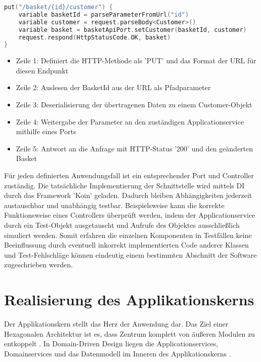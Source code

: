 \begin{minipage}{\linewidth} %
\begin{lstlisting}[caption={Beispiel eines Controllers zum aktualiseren von Kundendaten}, label={lst:controller}, language=Kotlin]
put("/basket/{id}/customer") { 
	variable basketId = parseParameterFromUrl("id")
	variable customer = request.parseBody<Customer>()  
	variable basket = basketApiPort.setCustomer(basketId, customer)
	request.respond(HttpStatusCode.OK, basket)
}
\end{lstlisting}

\begin{itemize}[noitemsep,nolistsep]
	\item Zeile 1: Definiert die HTTP-Methode als 'PUT' und das Format der URL für diesen Endpunkt
	\item Zeile 2: Auslesen der BasketId aus der URL als Pfadparameter
	\item Zeile 3: Deserialisierung der übertragenen Daten zu einem Customer-Objekt
	\item Zeile 4: Weitergabe der Parameter an den zuständigen Applicationservice mithilfe eines Ports
	\item Zeile 5: Antwort an die Anfrage mit HTTP-Status '200' und den geänderten Basket
\end{itemize}
\end{minipage}

Für jeden definierten Anwendungsfall ist ein entsprechender Port und Controller zuständig. Die tatsächliche Implementierung der Schnittstelle wird mittels \Gls{DI} durch das Framework 'Koin' geladen. Dadurch bleiben Abhängigkeiten jederzeit austauschbar und unabhängig testbar. Beispielsweise kann die korrekte Funktionsweise eines Controllers überprüft werden, indem der Applicationservice durch ein Test-Objekt ausgetauscht und Aufrufe des Objektes ausschließlich simuliert werden. Somit erfahren die einzelnen Komponenten in Testfällen keine Beeinflussung durch eventuell inkorrekt implementierten Code anderer Klassen und Test-Fehlschläge können eindeutig einem bestimmten Abschnitt der Software zugeschrieben werden. \cite{DI_2007, Lindooren.2007}

\section{Realisierung des Applikationskerns}

Der Applikationskern stellt das Herz der Anwendung dar. Das Ziel einer Hexagonalen Architektur ist es, dass Zentrum komplett von äußeren Modulen zu entkoppelt \cite{Cockburn.Hexagonal}. In Domain-Driven Design liegen die Applicationservices, Domainservices und das Datenmodell im Inneren des Applikationskerns \cite[S. 125ff.]{Vernon.2015}. 

